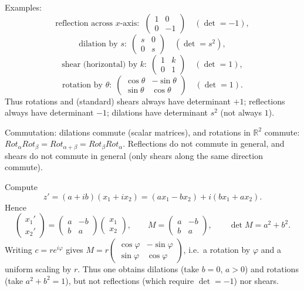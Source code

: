 \begin{solution}
\par\noindent\textbullet\quad Examples:
	\[
	\text{reflection across $x$-axis: }\;
	\begin{pmatrix}1&0\\0&-1\end{pmatrix}\quad(\det=-1),
	\]
	\[
	\text{dilation by }s:\;
	\begin{pmatrix}s&0\\0&s\end{pmatrix}\quad(\det=s^2),
	\]
	\[
	\text{shear (horizontal) by }k:\;
	\begin{pmatrix}1&k\\0&1\end{pmatrix}\quad(\det=1),
	\]
	\[
	\text{rotation by }\theta:\;
	\begin{pmatrix}\cos\theta&-\sin\theta\\ \sin\theta&\cos\theta\end{pmatrix}\quad(\det=1).
	\]
	Thus rotations and (standard) shears always have determinant $+1$; reflections always have determinant $-1$; dilations have determinant $s^2$ (not always $1$).

	Commutation: dilations commute (scalar matrices), and rotations in $\mathbb R^2$ commute:
	$Rot_\alpha Rot_\beta=Rot_{\alpha+\beta}=Rot_\beta Rot_\alpha$.
	Reflections do not commute in general, and shears do not commute in general (only shears along the same direction commute).
	\par\noindent\textbullet\quad Compute
	\[
	z'=(a+ib)(x_1+i x_2)=(ax_1-bx_2)+i(bx_1+ax_2).
	\]
	Hence
	\[
	\begin{pmatrix}x_1'\\x_2'\end{pmatrix}
	=
	\begin{pmatrix}a&-b\\ b&a\end{pmatrix}
	\begin{pmatrix}x_1\\x_2\end{pmatrix},
	\qquad
	M=\begin{pmatrix}a&-b\\ b&a\end{pmatrix},
	\qquad
	\det M=a^2+b^2.
	\]
	Writing $c=re^{i\varphi}$ gives
	$M=r\begin{pmatrix}\cos\varphi&-\sin\varphi\\ \sin\varphi&\cos\varphi\end{pmatrix}$,
	i.e.\ a rotation by $\varphi$ and a uniform scaling by $r$.
	Thus one obtains dilations (take $b=0$, $a>0$) and rotations (take $a^2+b^2=1$), but not reflections (which require $\det=-1$) nor shears.
\end{solution}

